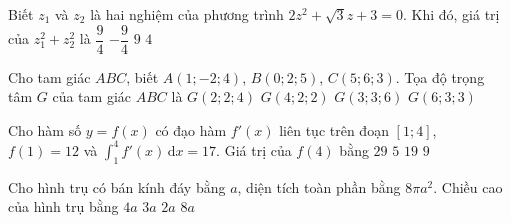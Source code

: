 \begin{ex}%
	Biết $z_1$ và $z_2$ là hai nghiệm của phương trình $2z^2+\sqrt{3}z+3=0$. Khi đó, giá trị của $z_1^2+z_2^2$ là
	\choice
	{$\dfrac{9}{4}$}
	{\True $-\dfrac{9}{4}$}
	{$9$}
	{$4$}
\end{ex}

\begin{ex}%
	Cho tam giác $ABC$, biết $A(1;-2;4)$, $B(0;2;5)$, $C(5;6;3)$. Tọa độ trọng tâm $G$ của tam giác $ABC$ là
	\choice
	{\True $G(2;2;4)$}
	{$G(4;2;2)$}
	{$G(3;3;6)$}
	{$G(6;3;3)$}
\end{ex}

\begin{ex}%
	Cho hàm số $y=f(x)$ có đạo hàm $f'(x)$ liên tục trên đoạn $[1;4]$, $f(1)=12$ và $\displaystyle\int_1^4 f'(x) \mathrm{\,d}x=17$. Giá trị của $f(4)$ bằng
	\choice
	{\True $29$}
	{$5$}
	{$19$}
	{$9$}
\end{ex}

\begin{ex}%
	Cho hình trụ có bán kính đáy bằng $a$, diện tích toàn phần bằng $8\pi a^2$. Chiều cao của hình trụ bằng
	\choice
	{$4a$}
	{\True $3a$}
	{$2a$}
	{$8a$}
\end{ex}

